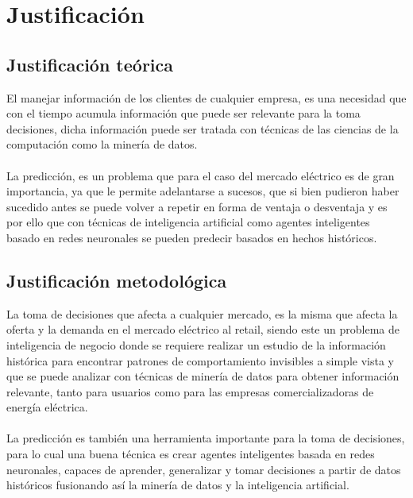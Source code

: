 \section{Justificación}

\subsection{Justificación teórica}
El manejar información de los clientes de cualquier empresa, es una necesidad que con el tiempo acumula información que puede ser relevante para la toma decisiones, dicha información puede ser tratada con técnicas de las ciencias de la computación como la minería de datos.
\\\\
La predicción, es un problema que para el caso del mercado eléctrico es de gran importancia, ya que le permite adelantarse a sucesos, que si bien pudieron haber sucedido antes se puede volver a repetir en forma de ventaja o desventaja y es por ello que con técnicas de inteligencia artificial como agentes inteligentes basado en redes neuronales se pueden predecir basados en hechos históricos.


\subsection{Justificación metodológica}

La toma de decisiones  que afecta a cualquier mercado, es la misma que afecta la oferta y la demanda en el mercado eléctrico al retail, siendo este un problema de inteligencia de negocio donde se requiere realizar un estudio de la información histórica para encontrar patrones de comportamiento invisibles a simple vista y que se puede analizar con técnicas de minería de datos para obtener información relevante, tanto para usuarios como para las empresas comercializadoras de energía eléctrica.
\\\\
La predicción es también una herramienta importante para la toma de decisiones, para lo cual una buena técnica es crear agentes inteligentes basada en redes neuronales, capaces de aprender, generalizar y tomar decisiones a partir de datos históricos fusionando así la minería de datos y la inteligencia artificial.


